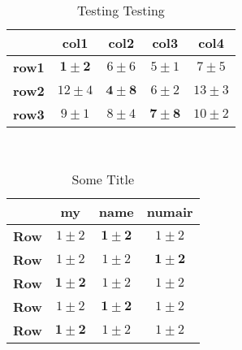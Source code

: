\documentclass{article}
\begin{document}
\begin{center}


\begin{table}[ht]
\centering
\begin{tabular}
{ |c|c|c|c|c| }
\hline
&\textbf{col1}&\textbf{col2}&\textbf{col3}&\textbf{col4}\\ [0.1ex]
\hline 
\textbf{row1}& $\mathbf{1 \pm 2}$ & $6 \pm 6$ & $5 \pm 1$ & $7 \pm 5$ \\ \hline
\textbf{row2}& $12 \pm 4$ & $\mathbf{4 \pm 8}$ & $6 \pm 2$ & $13 \pm 3$ \\ \hline
\textbf{row3}& $9 \pm 1$ & $8 \pm 4$ & $\mathbf{7 \pm 8}$ & $10 \pm 2$ \\ \hline
\end{tabular}
\\[-1.5ex]
\caption{Testing Testing}
\end{table}















\end{center}

\begin{table}[ht]
\centering
\begin{tabular}{|c|c|c|c|}

\hline
&\textbf{my} & \textbf{name} & \textbf{numair}
\\ [0.1ex]
 
\hline
\textbf{Row} & $1 \pm 2$ & $\mathbf{1 \pm 2}$ & $1 \pm 2$ \\ 
\hline
\textbf{Row} & $1 \pm 2$ & $1 \pm 2$ & $\mathbf{1 \pm 2}$ \\
\hline
\textbf{Row} & $\mathbf{1 \pm 2}$ & $1 \pm 2$ & $1 \pm 2$ \\
\hline
\textbf{Row} & $1 \pm 2$ & $\mathbf{1 \pm 2}$ & $1 \pm 2$ \\
\hline
\textbf{Row} & $\mathbf{1 \pm 2}$ & $1 \pm 2$ & $1 \pm 2$ \\
\hline %
\end{tabular}
\label{table:nonlin} %
\\[-1.5ex]
\caption{Some Title}
\end{table}
		
\end{document}
